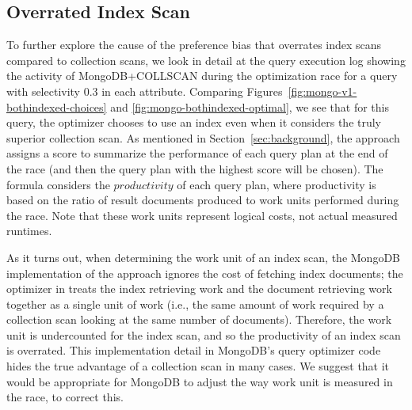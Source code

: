\vspace*{-0.5\baselineskip}
\subsection{Overrated Index Scan}

\begin{comment} Michael: agreed, this is a change in more recent results from what Dawei saw in earlier version of MongoDB. I've changed to a region where there is a clear difference
\af{This is confusing to me; selectivity (0.95.0.95) seems to be well in the region where COLLSCAN is chosen. }
\end{comment}

To further explore the cause of the preference bias that overrates index scans compared to collection scans, we look in detail at the query execution log showing the activity of MongoDB+COLLSCAN during the optimization race for a query with selectivity 0.3 in each attribute. Comparing Figures~\ref{fig:mongo-v1-bothindexed-choices} and \ref{fig:mongo-bothindexed-optimal}, we see that for this query, the optimizer chooses to use an index even when it considers the truly superior collection scan. As mentioned in Section~\ref{sec:background}, the \approachName approach assigns a score to summarize the performance of each query plan at the end of the race (and then the query plan with the highest score will be chosen). The formula considers the $productivity$ of each query plan, where productivity is based on the ratio of result documents produced to work units performed during the race. Note that these work units represent logical costs, not actual measured runtimes.

As it turns out, when determining the work unit of an index scan, the MongoDB implementation of the \approachName approach ignores the cost of fetching index documents; the optimizer in \relname treats the index retrieving work and the document retrieving work together as a single unit of work (i.e., the same amount of work required by a collection scan looking at the same number of documents). Therefore, the work unit is undercounted for the index scan, and so the productivity of an index scan is overrated. This implementation detail in MongoDB's query optimizer code hides the true advantage of a collection scan in many cases.  We suggest that it would be appropriate for MongoDB to adjust the way work unit is measured in the race, to correct this.

